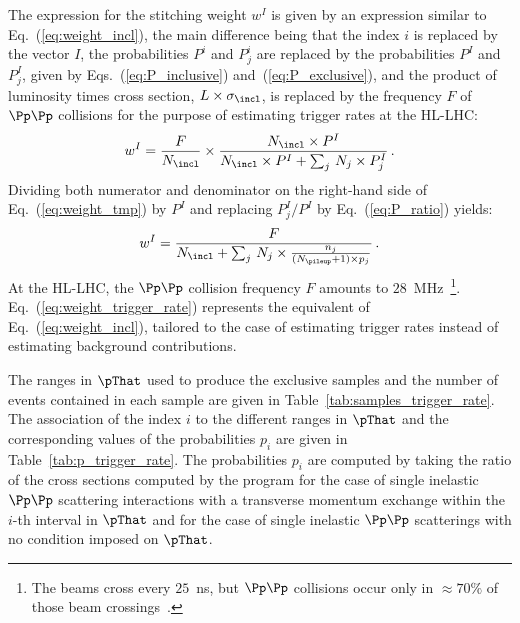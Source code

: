 The expression for the stitching weight $w^{I}$ is given by an expression similar to Eq.~(\ref{eq:weight_incl}),
the main difference being that the index $i$ is replaced by the vector $I$,
the probabilities $P^{i}$ and $P_{j}^{i}$ are replaced by the probabilities $P^{I}$ and $P_{j}^{I}$, given by Eqs.~(\ref{eq:P_inclusive}) and~(\ref{eq:P_exclusive}),
and the product of luminosity times cross section, $L \times \sigma_{\incl}$, is replaced by the frequency $F$ of $\Pp\Pp$ collisions 
for the purpose of estimating trigger rates at the HL-LHC:
\begin{equation}
w^{I} = \frac{F}{N_{\incl}} \times \frac{N_{\incl} \times P^{I}}{N_{\incl} \times P^{I} + \sum_{j} \, N_{j} \times P_{j}^{I}} \, .
\label{eq:weight_tmp}
\end{equation}
Dividing both numerator and denominator on the right-hand side of Eq.~(\ref{eq:weight_tmp}) by $P^{I}$ and replacing $P_{j}^{I}/P^{I}$ by Eq.~(\ref{eq:P_ratio}) yields:
\begin{equation}
w^{I} = \frac{F}{N_{\incl} + \sum_{j} \, N_{j} \times \frac{n_{j}}{(N_{\pileup} + 1) \times p_{j}}} \, .
\label{eq:weight_trigger_rate}
\end{equation}
At the HL-LHC, the $\Pp\Pp$ collision frequency $F$ amounts to $28$~MHz~\footnote{
  The beams cross every $25$~ns, but $\Pp\Pp$ collisions occur only in $\approx 70\%$ of those beam crossings~\cite{TDR_Phase2_LHC}.}.
Eq.~(\ref{eq:weight_trigger_rate}) represents the equivalent of Eq.~(\ref{eq:weight_incl}),
tailored to the case of estimating trigger rates instead of estimating background contributions.

The ranges in $\pThat$ used to produce the exclusive samples and the number of events contained in each sample
are given in Table~\ref{tab:samples_trigger_rate}.
The association of the index $i$ to the different ranges in $\pThat$ and the 
corresponding values of the probabilities $p_{i}$ are given in Table~\ref{tab:p_trigger_rate}.
The probabilities $p_{i}$ are computed by taking the ratio of the cross sections computed by the program \PYTHIA
for the case of single inelastic $\Pp\Pp$ scattering interactions with a transverse momentum exchange within the $i$-th interval in $\pThat$
and for the case of single inelastic $\Pp\Pp$ scatterings with no condition imposed on $\pThat$.

